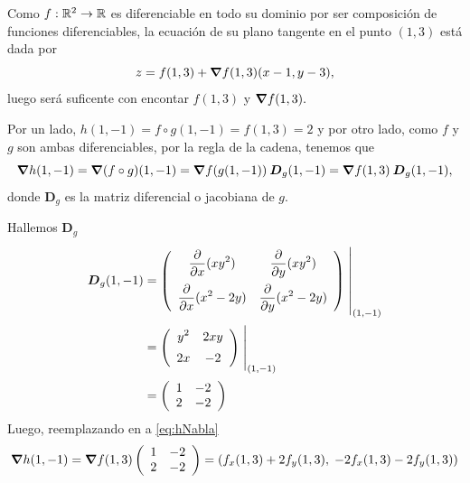 \newpage
\begin{solution}

    Como   $f:\mathbb{R}^2\to\mathbb{R}$ es diferenciable en todo su dominio por ser composición de funciones diferenciables,  la ecuaci\'on de su plano tangente en el punto $(1,3)$ est\'a dada por
    \begin{equation}
        z= f(1,3) + \grad f(1,3) (x-1,y-3),  \label{eq:zNabla2}
    \end{equation}   luego ser\'a  suficente con encontar $ f(1,3)$ y $\grad f(1,3).$

    Por un lado,      $h(1,-1)= f\circ g (1,-1) =  f(1,3)=2$  y por otro lado,  como $f$ y $g$ son ambas diferenciables,  por la regla de la cadena,  tenemos que
    \begin{equation}
        \grad h(1,-1)=\grad (f\circ g)(1,-1)=\grad f(g(1,-1)) \:\boldsymbol{D}_g(1,-1) = \grad f (1,3) \:\boldsymbol{D}_g(1,-1),  \label{eq:hNabla3}
    \end{equation}    donde $\boldsymbol{D}_g$ es la matriz diferencial o  jacobiana de $g$.

    \noindent  Hallemos $\boldsymbol{D}_g$
    \begin{align*}
        \boldsymbol{D}_g(1,-1) & =
        \left(\begin{array}{cc}
                      \displaystyle\partialx (xy^2)            & \displaystyle\partialy (xy^2)           \\[10pt]
                      \displaystyle\partialx  (x^2 -2y) & \displaystyle\partialy (x^2 -2y)
                  \end{array}\right)\left.\rule{0pt}{1.1cm}\right\rvert_{(1,-1)}             \\[2pt]
                              & =\left(\begin{array}{cc}
                                               \displaystyle y^2                 & \displaystyle 2xy              \\[5pt]
                                               \displaystyle   2x & \displaystyle -2
                                           \end{array}\right)\left.\rule{0pt}{0.7cm}\right\rvert_{(1,-1)} \\[2pt]
                              & =\left(\begin{array}{cc}
                                               1    & -2    \\
                                               2 & -2
                                           \end{array}\right)
    \end{align*}
    Luego, reemplazando en  a   \eqref{eq:hNabla}
    \[
        \grad h(1,-1) = \grad f(1,3)\left(\begin{array}{cc}
                1   & -2    \\
                2 & -2
            \end{array}\right) = \left(f_x(1,3) + 2f_y(1,3),\;-2f_x(1,3)-2f_y(1,3)\right)
    \]


\end{solution}
